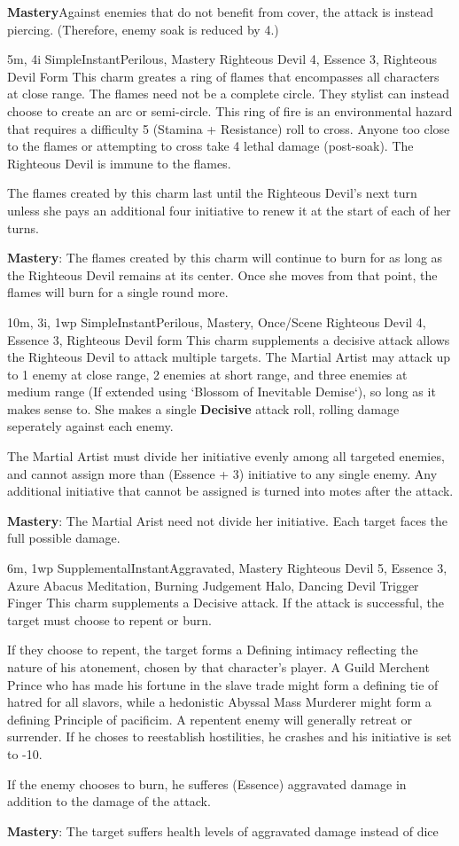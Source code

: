 \textbf{Mastery}Against enemies that do not benefit from cover, the attack is instead piercing.
(Therefore, enemy soak is reduced by 4.)

{5m, 4i}
{Simple}{Instant}{Perilous, Mastery}
{Righteous Devil 4, Essence 3, Righteous Devil Form}
This charm greates a ring of flames that encompasses all characters at close range.
The flames need not be a complete circle.
They stylist can instead choose to create an arc or semi-circle.
This ring of fire is an environmental hazard that requires a difficulty 5 (Stamina + Resistance) roll to cross.
Anyone too close to the flames or attempting to cross take 4 lethal damage (post-soak).
The Righteous Devil is immune to the flames.

The flames created by this charm last until the Righteous Devil's next turn unless she pays an additional four initiative to renew it at the start of each of her turns.

\textbf{Mastery}: The flames created by this charm will continue to burn for as long as the Righteous Devil remains at its center.
Once she moves from that point, the flames will burn for a single round more.

{10m, 3i, 1wp}
{Simple}{Instant}{Perilous, Mastery, Once/Scene}
{Righteous Devil 4,  Essence 3, Righteous Devil form}
This charm supplements a decisive attack allows the Righteous Devil to attack multiple targets.
The Martial Artist may attack  up to
1 enemy at close range,
2 enemies at short range,
and three enemies at medium range
(If extended using `Blossom of Inevitable Demise`),
so long as it makes sense to.
She makes a single \textbf{Decisive} attack roll,
rolling damage seperately against each enemy.

The Martial Artist must divide her initiative evenly among all targeted enemies,
and cannot assign more than (Essence + 3) initiative to any single enemy.
Any additional initiative that cannot be assigned is turned into motes after the attack.

\textbf{Mastery}: The Martial Arist need not divide her initiative.
Each target faces the full possible damage.

{6m, 1wp}
{Supplemental}{Instant}{Aggravated, Mastery}
{Righteous Devil 5, Essence 3, Azure Abacus Meditation, Burning Judgement Halo, Dancing Devil Trigger Finger}
This charm supplements a Decisive attack.
If the attack is successful, the target must choose to repent or burn.

If they choose to repent, the target forms a Defining intimacy reflecting the nature of his atonement,
chosen by that character's player.
A Guild Merchent Prince who has made his fortune in the slave trade might form a defining tie of hatred for all slavors,
while a hedonistic Abyssal Mass Murderer might form a defining Principle of pacificim.
A repentent enemy will generally retreat or surrender.
If he choses to reestablish hostilities, he crashes and his initiative is set to -10.

If the enemy chooses to burn, he sufferes (Essence) aggravated damage in addition to the damage of the attack.

\textbf{Mastery}: The target suffers health levels of aggravated damage instead of dice
